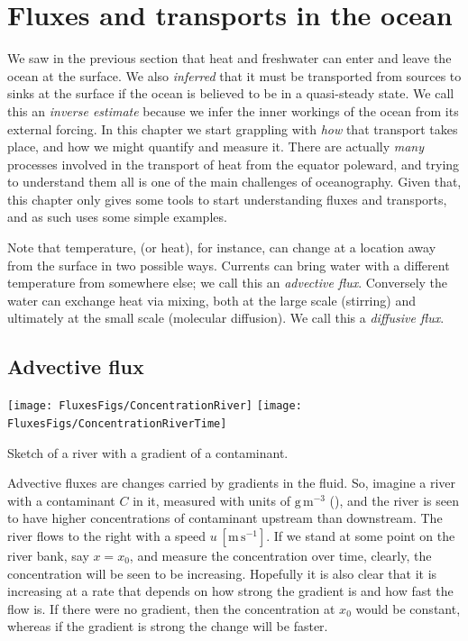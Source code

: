\section{Fluxes and transports in the ocean}
\label{sec:fluxestransports}

We saw in the previous section that heat and freshwater can enter and leave the ocean at the surface.  We also \emph{inferred} that it must be transported from sources to sinks at the surface if the ocean is believed to be in a quasi-steady state.  We call this an \emph{inverse estimate} because we infer the inner workings of the ocean from its external forcing.  In this chapter we start grappling with \emph{how} that transport takes place, and how we might quantify and measure it.  There are actually \emph{many} processes involved in the transport of heat from the equator poleward, and trying to understand them all is one of  the main challenges of oceanography.  Given that, this chapter only gives some tools to start understanding fluxes and transports, and as such uses some simple examples.  

Note that temperature, (or heat), for instance, can change at a location away from the surface in two possible ways.  Currents can bring water with a different temperature from somewhere else; we call this an \emph{advective flux}.    Conversely the water can exchange heat via mixing, both at the large scale (stirring) and ultimately at the small scale (molecular diffusion).  We call this a \emph{diffusive flux}.  

\subsection{Advective flux} 

\begin{marginfigure}
\begin{center}
\texttt{[image: FluxesFigs/ConcentrationRiver]}
\texttt{[image: FluxesFigs/ConcentrationRiverTime]}
 \caption{Sketch of a river with a gradient of a contaminant.}
  \label{fig:ConcentrationRiver}
\end{center}
\end{marginfigure}


Advective fluxes are changes carried by gradients in the fluid.  So, imagine a river with a contaminant $C$ in it, measured with units of $\mathrm{g\,m^{-3}}$ (), and the river is seen to have higher concentrations of contaminant upstream than downstream.    The river flows to the right with a speed $u\ \mathrm{[m\,s^{-1}]}$.   If we stand at some point on the river bank, say $x = x_0$, and measure the concentration over time, clearly, the concentration will be seen to be increasing.  Hopefully it is also clear that it is increasing at a rate that depends on how strong the gradient is and how fast the flow is.  If there were no gradient, then the concentration at $x_0$ would be constant, whereas if the gradient is strong the change will be faster.  


